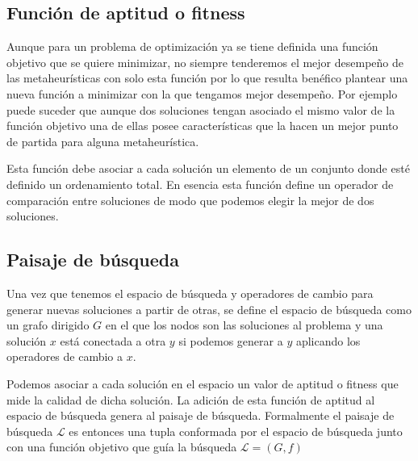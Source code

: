 \subsection{Función de aptitud o fitness}
Aunque para un problema de optimización ya se tiene definida una función objetivo que se quiere minimizar, no siempre tenderemos el mejor desempeño de las metaheurísticas con solo esta función por lo que resulta benéfico plantear una nueva función a minimizar con la que tengamos mejor desempeño. Por ejemplo puede suceder que aunque dos soluciones tengan asociado el mismo valor de la función objetivo una de ellas posee características que la hacen un mejor punto de partida para alguna metaheurística.

Esta función debe asociar a cada solución un elemento de un conjunto donde esté definido un ordenamiento total. En esencia esta función define un operador de comparación entre soluciones de modo que podemos elegir la mejor de dos soluciones.\\

\subsection{Paisaje de búsqueda}

Una vez que tenemos el espacio de búsqueda y operadores de cambio para generar nuevas soluciones a partir de otras, se define el espacio de búsqueda como un grafo dirigido $G$ en el que los nodos son las soluciones al problema y una solución $x$ está conectada a otra $y$ si podemos generar a $y$ aplicando los operadores de cambio a $x$.

Podemos asociar a cada solución en el espacio un valor de aptitud o fitness que mide la calidad de dicha solución. La adición de esta función de aptitud al espacio de búsqueda genera al paisaje de búsqueda. Formalmente el paisaje de búsqueda $\mathcal{L}$ es entonces una tupla conformada por el espacio de búsqueda junto con una función objetivo que guía la búsqueda $\mathcal{L}=(G,f)$

